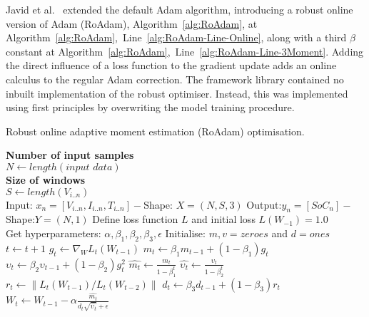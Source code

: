 %
Javid et al.~\cite{javid_adaptive_2020} extended the default Adam algorithm, introducing a robust online version of Adam (RoAdam), Algorithm~\ref{alg:RoAdam}, at \mbox{Algorithm~\ref{alg:RoAdam}, Line~\ref{alg:RoAdam-Line-Online}}, along with a third $\beta$ constant at \mbox{Algorithm~\ref{alg:RoAdam}, Line~\ref{alg:RoAdam-Line-3Moment}}.
Adding the direct influence of a loss function to the gradient update adds an online calculus to the regular Adam correction.
The framework library contained no inbuilt implementation of the robust optimiser.
Instead, this was implemented using first principles by overwriting the model training procedure.
\begin{algorithm}[H]%
  \caption{Robust online adaptive moment estimation (RoAdam) optimisation.}
  \begin{algorithmic}[1]
    \STATE \textbf{Number of input samples} \\ $N\gets length(\textit{input data})$\\
    \STATE \textbf{Size of windows} \\ $S\gets length(V_{i..n})$\\
    \STATE Input: $x_n = [V_{i..n}, I_{i..n}, T_{i..n}] - $Shape: $X = (N, S, 3)$
    \STATE Output:$y_n = [SoC_{n}] - $Shape:$Y = (N, 1)$
    \STATE Define loss function $L$ and initial loss $L\left(W_{-1}\right) = 1.0$ \label{alg:RoAdam-Line-Loss}\\
    Get hyperparameters: $\alpha, \beta_1, \beta_2, \beta_3, \epsilon$
    \STATE Initialise: $m,v=zeroes$ and $d=ones$ \label{alg:RoAdam-Line-Vars} \\
      \STATE $t \gets t+1$
      \STATE $g_t \gets \nabla_W L_t (W_{t-1})$ 
      \STATE $m_t \gets \beta_1 m_{t-1}+(1-\beta_1) g_t $ 
      \STATE $\upsilon_t \gets \beta_2 \upsilon_{t-1}+ \left(1-\beta_2 \right)g^2_t $ 
      \STATE $\hat{m_t} \gets \frac{m_t}{1-\beta^t_1}$ 
      \STATE $\hat{\upsilon_t} \gets \frac{\upsilon_t}{1-\beta^t_2} $ 
      \STATE $r_t \gets \parallel L_t\left(W_{t-1}\right)/L_t\left(W_{t-2}\right) \parallel $ 
      \STATE $d_t \gets \beta_3 d_{t-1}+\left(1-\beta_3\right)r_t $ 
      \STATE $W_t \gets W_{t-1}- \alpha \frac{\hat{m_t}}{d_t\sqrt{\hat{\upsilon_t}}+\epsilon} $ 
    \ENDWHILE
  \end{algorithmic}
  \label{alg:RoAdam}
\end{algorithm}
